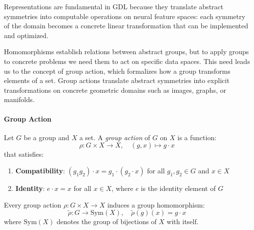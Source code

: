 Representations are fundamental in \gls{GDL} because they translate abstract symmetries into computable operations on neural feature spaces: each symmetry of the domain becomes a concrete linear transformation that can be implemented and optimized.

Homomorphisms establish relations between abstract groups, but to apply groups to concrete problems we need them to act on specific data spaces. This need leads us to the concept of group action, which formalizes how a group transforms elements of a set. Group actions translate abstract symmetries into explicit transformations on concrete geometric domains such as images, graphs, or manifolds.

\paragraph{Group Action}

\begin{definition}\label{def:accion_grupo}
Let $G$ be a group and $X$ a set. A \textit{group action} of $G$ on $X$ is a function:
\begin{equation}
\rho: G \times X \rightarrow X, \quad (g, x) \mapsto g \cdot x
\end{equation}
that satisfies:
\begin{enumerate}
    \item \textbf{Compatibility}: $(g_1 g_2) \cdot x = g_1 \cdot (g_2 \cdot x)$ for all $g_1, g_2 \in G$ and $x \in X$
    \item \textbf{Identity}: $e \cdot x = x$ for all $x \in X$, where $e$ is the identity element of $G$
\end{enumerate}
\end{definition}

\begin{proposition}\label{prop:acciones_homomorfismos}
Every group action $\rho: G \times X \rightarrow X$ induces a group homomorphism:
\begin{equation}
\tilde{\rho}: G \rightarrow \text{Sym}(X), \quad \tilde{\rho}(g)(x) = g \cdot x
\end{equation}
where $\text{Sym}(X)$ denotes the group of bijections of $X$ with itself.
\end{proposition}

